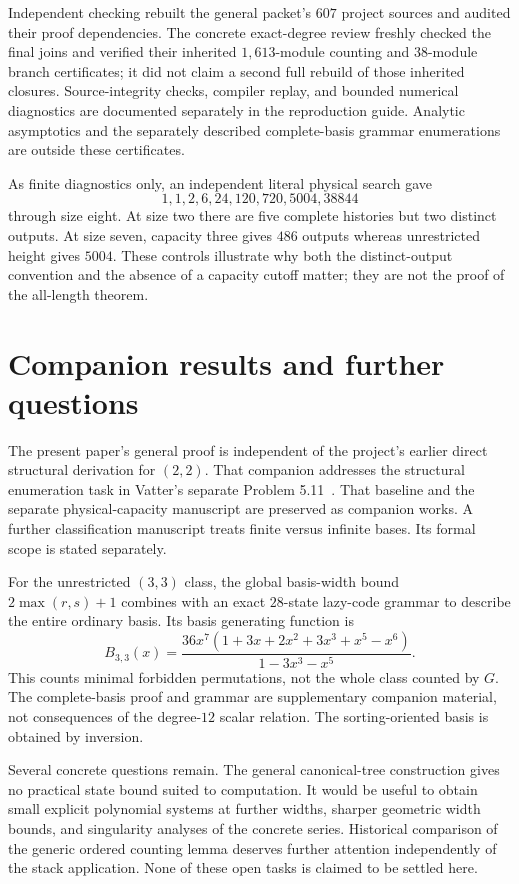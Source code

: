 \documentclass[11pt]{article}
\theoremstyle{definition}\newtheorem{definition}[theorem]{Definition}
\theoremstyle{remark}\newtheorem{remark}[theorem]{Remark}
\begin{document}
Independent checking rebuilt the general packet's $607$ project sources and audited their proof dependencies. The concrete exact-degree review freshly checked the final joins and verified their inherited $1{,}613$-module counting and $38$-module branch certificates; it did not claim a second full rebuild of those inherited closures. Source-integrity checks, compiler replay, and bounded numerical diagnostics are documented separately in the reproduction guide. Analytic asymptotics and the separately described complete-basis grammar enumerations are outside these certificates.

As finite diagnostics only, an independent literal physical search gave
\[
 1,1,2,6,24,120,720,5004,38844
\]
through size eight. At size two there are five complete histories but two distinct outputs. At size seven, capacity three gives $486$ outputs whereas unrestricted height gives $5004$. These controls illustrate why both the distinct-output convention and the absence of a capacity cutoff matter; they are not the proof of the all-length theorem.

\section{Companion results and further questions}
The present paper's general proof is independent of the project's earlier direct structural derivation for $(2,2)$. That companion addresses the structural enumeration task in Vatter's separate Problem 5.11~\cite{Vatter2026}. That baseline and the separate physical-capacity manuscript are preserved as companion works. A further classification manuscript treats finite versus infinite bases. Its formal scope is stated separately.

For the unrestricted $(3,3)$ class, the global basis-width bound $2\max(r,s)+1$ combines with an exact $28$-state lazy-code grammar to describe the entire ordinary basis. Its basis generating function is
\[
 B_{3,3}(x)=\frac{36x^7(1+3x+2x^2+3x^3+x^5-x^6)}{1-3x^3-x^5}.
\]
This counts minimal forbidden permutations, not the whole class counted by $G$. The complete-basis proof and grammar are supplementary companion material, not consequences of the degree-$12$ scalar relation. The sorting-oriented basis is obtained by inversion.

Several concrete questions remain. The general canonical-tree construction gives no practical state bound suited to computation. It would be useful to obtain small explicit polynomial systems at further widths, sharper geometric width bounds, and singularity analyses of the concrete series. Historical comparison of the generic ordered counting lemma deserves further attention independently of the stack application. None of these open tasks is claimed to be settled here.
\end{document}

